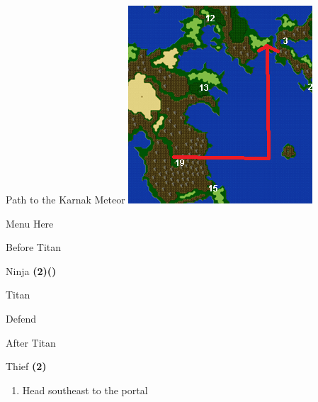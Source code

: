 \begin{paracol}{2}
\switchcolumn
\begin{misc}{Path to the Karnak Meteor}
    \includegraphics[scale=0.532]{../Graphics/Maps/10. To Karnak Meteor.png}
\end{misc}

\begin{misc}{Menu Here}
\end{misc}

\switchcolumn
\begin{menu}{Before Titan}
    \varwb
    \begin{jobMenu}
        \lenna Ninja \textbf{(2\pointLeft)(\pointDown)} \ability{!\black}
    \end{jobMenu}
    \varwe
\end{menu}

\begin{boss}{Titan}
	\varwb
	\begin{round}{1}
		\lenna Defend
        \faris \leftCommand{\gilToss}
        \bartz \rightCommand{\hide}
        \lenna \leftCommand{\throw} \then \thunderScroll
    \end{round}
	\varwe
\end{boss}

\begin{menu}{After Titan}
    \varwb
    \begin{jobMenu}
        \bartz Thief \textbf{(2\pointRight)} \optimize
    \end{jobMenu}
    \begin{itemMenu}
        \item {}
        \item[] 
    \end{itemMenu}
    \varwe
\end{menu}

\begin{enumerate}[resume]
    \item Head southeast to the portal
\end{enumerate}

\end{paracol}